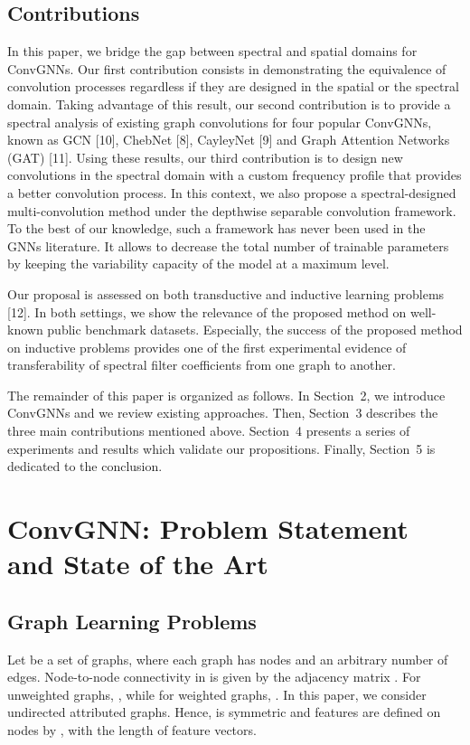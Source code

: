 \documentclass{article}
\begin{document}
\subsection*{Contributions}

In this paper, we bridge the gap between spectral and spatial domains for ConvGNNs. Our first contribution consists in demonstrating the equivalence of convolution processes regardless if they are designed in the spatial or the spectral domain. Taking advantage of this result, our second contribution is to  provide a spectral analysis of existing graph convolutions for four popular ConvGNNs, known as GCN [10], ChebNet [8], CayleyNet [9] and Graph Attention Networks (GAT) [11]. Using these results, our third contribution is to  design new convolutions in the spectral domain with a custom frequency profile
that provides a better convolution process. In this context, we also propose a spectral-designed multi-convolution method under the depthwise separable convolution framework. To the best of our knowledge, such a framework has never been used in the GNNs literature. It allows to decrease the total number of trainable parameters by keeping the variability capacity of the model at a maximum level. 

Our proposal is assessed on both transductive and inductive learning problems  [12]. 
In both settings, we show the relevance of the proposed method on well-known public benchmark datasets. Especially, the success of the proposed method on inductive problems provides one of the first experimental evidence of transferability of spectral filter coefficients from one graph to another.

The remainder of this paper is organized as follows. In Section~2, we introduce ConvGNNs and we review existing approaches. Then, Section~3 describes the three main contributions mentioned above. Section~4 presents a series of experiments and results which validate our propositions. Finally, Section~5 is dedicated to the conclusion. 

\section{ConvGNN: Problem Statement and State of the Art}

\subsection{Graph Learning Problems}
\label{secGLP}
Let  be a set of graphs, where each graph  has  nodes and an arbitrary number of edges. Node-to-node connectivity in  is given by the adjacency matrix . For unweighted graphs, , while for weighted graphs, . In this paper, we consider undirected attributed graphs. Hence,  is symmetric and features are defined on nodes by , with  the length of feature vectors.
\end{document}

